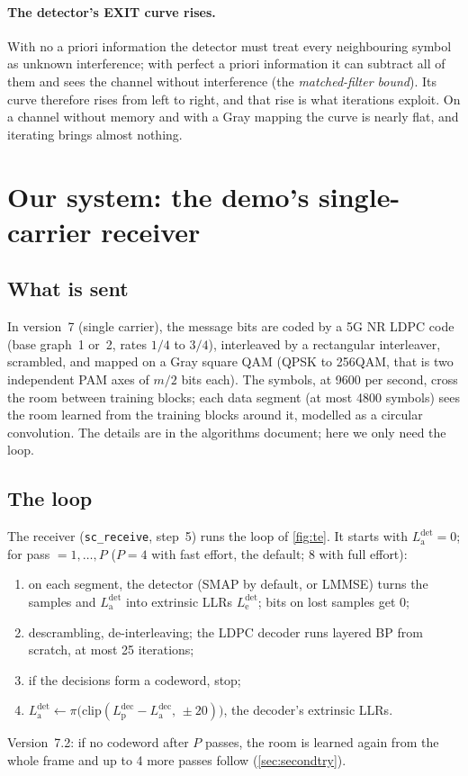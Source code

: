 \documentclass[11pt,a4paper]{article}
\newcommand{\code}[1]{\texttt{#1}}
\newcommand{\La}{L_{\mathrm{a}}}
\newcommand{\Le}{L_{\mathrm{e}}}
\newcommand{\Lp}{L_{\mathrm{p}}}
\theoremstyle{definition}
\theoremstyle{remark}
\begin{document}
\paragraph{The detector's EXIT curve rises.} With no a priori information the detector must treat every neighbouring symbol as unknown interference; with perfect a priori information it can subtract all of them and sees the channel without interference (the \emph{matched-filter bound}). Its curve therefore rises from left to right, and that rise is what iterations exploit. On a channel without memory and with a Gray mapping the curve is nearly flat, and iterating brings almost nothing.

\section{Our system: the demo's single-carrier receiver}
\label{sec:modem}

\subsection{What is sent}

In version~7 (single carrier), the message bits are coded by a 5G NR LDPC code (base graph~1 or~2, rates $1/4$ to $3/4$), interleaved by a rectangular interleaver, scrambled, and mapped on a Gray square QAM (QPSK to 256QAM, that is two independent PAM axes of $m/2$ bits each). The symbols, at 9600 per second, cross the room between training blocks; each data segment (at most 4800 symbols) sees the room learned from the training blocks around it, modelled as a circular convolution. The details are in the algorithms document; here we only need the loop.

\subsection{The loop}

The receiver (\code{sc\_receive}, step~5) runs the loop of \cref{fig:te}. It starts with $\La^{\mathrm{det}}= 0$; for pass $=1,\dots,P$ ($P=4$ with fast effort, the default; $8$ with full effort):
\begin{enumerate}[leftmargin=*]
  \item on each segment, the detector (SMAP by default, or LMMSE) turns the samples and $\La^{\mathrm{det}}$ into extrinsic LLRs $\Le^{\mathrm{det}}$; bits on lost samples get 0;
  \item descrambling, de-interleaving; the LDPC decoder runs layered BP from scratch, at most 25 iterations;
  \item if the decisions form a codeword, stop;
  \item $\La^{\mathrm{det}} \gets \pi\big(\mathrm{clip}(\Lp^{\mathrm{dec}}-\La^{\mathrm{dec}},\,\pm 20)\big)$, the decoder's extrinsic LLRs.
\end{enumerate}
Version~7.2: if no codeword after $P$ passes, the room is learned again from the whole frame and up to 4 more passes follow (\cref{sec:secondtry}).
\end{document}
